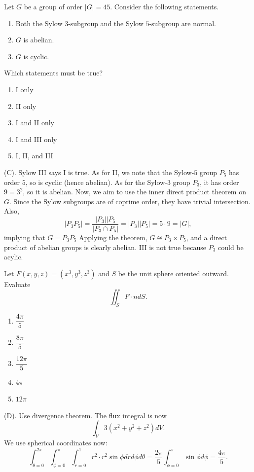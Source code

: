 \begin{exercise}
Let $G$ be a group of order $|G| = 45$. Consider the following statements.
\begin{enumerate}[label=\Roman*.]
    \item Both the Sylow $3$-subgroup
    and the Sylow $5$-subgroup
    are normal.
    \item $G$ is abelian.
    \item $G$ is cyclic.
\end{enumerate}
Which statements must be true?
\begin{enumerate}[label=(\Alph*)]
    \item I only
    \item II only
    \item I and II only
    \item I and III only
    \item I, II, and III
\end{enumerate}
\end{exercise}
\begin{solution}
(C). Sylow III says I is true. As for II, we note that the Sylow-$5$ group $P_5$ has 
order $5$, so is cyclic (hence abelian). As for the Sylow-$3$ group $P_3$, it has order $9 = 3^2$, 
so it is abelian. Now, we aim to use the inner direct product theorem on $G$.
Since the Sylow subgroups are of coprime order, they have trivial intersection. 
Also,
\[
|P_3P_5| = \frac{|P_3||P_5}{|P_3 \cap P_5|} = |P_3||P_5| = 5 \cdot 9 = |G|,
\]
implying that $G = P_3 P_5$ Applying the theorem, $G \cong P_3 \times P_5$, and a direct 
product of abelian groups is clearly abelian. III is not true because $P_3$ could be acylic.
\end{solution}


\begin{exercise}
Let $F(x,y,z)=(x^3,y^3,z^3)$ and $S$ be the unit sphere oriented outward.
Evaluate
\[
\iint_S F\cdot n dS.
\]
\begin{enumerate}[label=(\Alph*)]
    \item $\dfrac{4\pi}{5}$
    \item $\dfrac{8\pi}{5}$
    \item $\dfrac{12\pi}{5}$
    \item $4\pi$
    \item $12\pi$
\end{enumerate}
\end{exercise}
\begin{solution}
(D). Use divergence theorem. The flux integral is now 
\[
\int_V 3(x^2 + y^2 + z^2) dV.
\]
We use spherical coordinates now:
\[
\int_{\theta = 0}^{2\pi}\int_{\phi = 0}^{\pi}\int_{r = 0}^1 r^2 \cdot r^2\sin\phi dr d\phi d\theta
= \frac{2\pi}{5} \int_{\phi = 0}^{\pi}\sin\phi d\phi
= \frac{4\pi}{5}.
\]
\end{solution}

